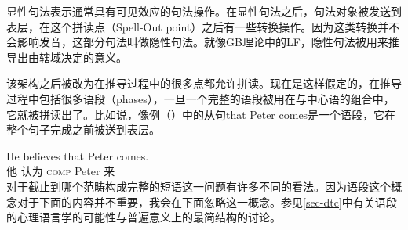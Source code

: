 显性句法表示通常具有可见效应的句法操作。在显性句法之后，句法对象被发送到表层，在这个拼读点（Spell-Out point）之后有一些转换操作。因为这类转换并不会影响发音，这部分句法叫做隐性句法。就像GB理论中的LF，隐性句法被用来推导出由辖域决定的意义。

该架构之后被改为在推导过程中的很多点都允许拼读。现在是这样假定的，在推导过程中包括很多语段（phases），一旦一个完整的语段被用在与中心语的组合中\citep{Chomsky2008a}，它就被拼读出了。比如说，像例（）中的从句that Peter comes是一个语段，它在整个句子完成之前被送到表层。

\ea
\gll He believes that Peter comes.\\
他 认为 \textsc{comp} Peter 来\\
\z
对于截止到哪个范畴构成完整的短语这一问题有许多不同的看法。因为语段这个概念对于下面的内容并不重要，我会在下面忽略这一概念。参见\ref{sec-dtc}中有关语段的心理语言学的可能性与普遍意义上的最简结构的讨论。

